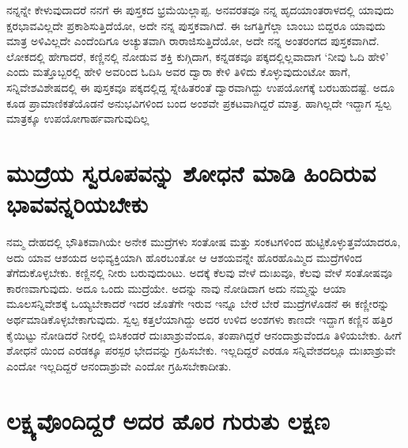 ನನ್ನನ್ನೇ ಕೇಳುವುದಾದರೆ ನನಗೆ ಈ ಪುಸ್ತಕದ ಭ್ರಮೆಯಿಲ್ಲಾಪ್ಪ. ಅನವರತವೂ ನನ್ನ ಹೃದಯಾಂತರಾಳದಲ್ಲಿ ಯಾವುದು ಕ್ಷರಭಾವವಿಲ್ಲದೇ ಪ್ರಕಾಶಿಸುತ್ತಿದೆಯೋ, ಅದೇ ನನ್ನ ಪುಸ್ತಕವಾಗಿದೆ. ಈ ಜಗತ್ತಿಗೆಲ್ಲಾ ಬಾಂಬು ಬಿದ್ದರೂ ಯಾವುದು ಮಾತ್ರ ಅಳಿವಿಲ್ಲದೇ ಎಂದೆಂದಿಗೂ ಅಚ್ಯುತವಾಗಿ ರಾರಾಜಿಸುತ್ತಿದೆಯೋ, ಅದೇ ನನ್ನ ಅಂತರಂಗದ ಪುಸ್ತಕವಾಗಿದೆ. ಲೋಕದಲ್ಲಿ ಹೇಗಾದರೆ, ಕಣ್ಣಿನಲ್ಲಿ ನೋಡುವ ಶಕ್ತಿ ಕುಗ್ಗಿದಾಗ, ಕನ್ನಡಕವೂ ಪಕ್ಕದಲ್ಲಿಲ್ಲವಾದಾಗ `ನೀವು ಓದಿ ಹೇಳಿ' ಎಂದು ಮತ್ತೊಬ್ಬರಲ್ಲಿ ಹೇಳಿ ಅವರಿಂದ ಓದಿಸಿ ಅವರ ದ್ವಾರಾ ಕೇಳಿ ತಿಳಿದು ಕೊಳ್ಳುವುದುಂಟೋ ಹಾಗೆ, ಸನ್ನಿವೇಶವಿಶೇಷದಲ್ಲಿ ಈ ಪುಸ್ತಕವೂ ಪಕ್ಕದಲ್ಲಿದ್ದ ಸ್ನೇಹಿತರಂತೆ ದ್ವಾರವಾಗಿದ್ದು ಉಪಯೋಗಕ್ಕೆ ಬರಬಹುದಷ್ಟೆ. ಅದೂ ಕೂಡ ಪ್ರಾಮಾಣಿಕತೆಯೊಡನೆ ಅನುಭವಿಗಳಿಂದ ಬಂದ ಅಂಶವೇ ಪ್ರಕಟವಾಗಿದ್ದರೆ ಮಾತ್ರ. ಹಾಗಿಲ್ಲದೇ ಇದ್ದಾಗ ಸ್ವಲ್ಪ ಮಾತ್ರಕ್ಕೂ ಉಪಯೋಗಾರ್ಹವಾಗುವುದಿಲ್ಲ

\section*{ಮುದ್ರೆಯ ಸ್ವರೂಪವನ್ನು ಶೋಧನೆ ಮಾಡಿ ಹಿಂದಿರುವ ಭಾವವನ್ನರಿಯಬೇಕು}

ನಮ್ಮ ದೇಹದಲ್ಲಿ ಭೌತಿಕವಾಗಿಯೇ ಅನೇಕ ಮುದ್ರೆಗಳು ಸಂತೋಷ ಮತ್ತು ಸಂಕಟಗಳಿಂದ ಹುಟ್ಟಿಕೊಳ್ಳುತ್ತವೆಯಾದರೂ, ಅದು ಯಾವ ಆಶಯದ ಅಭಿವ್ಯಕ್ತಿಯಾಗಿ ಹೊರಬಂತೋ ಆ ಆಶಯವನ್ನೇ ಹೊರಹೊಮ್ಮಿದ ಮುದ್ರೆಗಳಿಂದ ತೆಗೆದುಕೊಳ್ಳಬೇಕು. ಕಣ್ಣಿನಲ್ಲಿ ನೀರು ಬರುವುದುಂಟು. ಅದಕ್ಕೆ ಕೆಲವು ವೇಳೆ ದುಃಖವೂ, ಕೆಲವು ವೇಳೆ ಸಂತೋಷವೂ ಕಾರಣವಾಗುವುದು. ಅದೂ ಒಂದು ಮುದ್ರೆಯೇ. ಅದನ್ನು ನಾವು ನೋಡಿದಾಗ ಅದು ನಮ್ಮನ್ನು ಆಯಾ ಮೂಲಸನ್ನಿವೇಶಕ್ಕೆ ಒಯ್ಯಬೇಕಾದರೆ ಇದರ ಜೊತೆಗೇ ಇರುವ ಇನ್ನೂ ಬೇರೆ ಬೇರೆ ಮುದ್ರೆಗಳೊಡನೆ ಈ ಕಣ್ಣೀರನ್ನು  ಅರ್ಥಮಾಡಿಕೊಳ್ಳಬೇಕಾಗುವುದು. ಸ್ವಲ್ಪ ಕತ್ತಲೆಯಾಗಿದ್ದು ಅದರ ಉಳಿದ ಅಂಶಗಳು ಕಾಣದೇ ಇದ್ದಾಗ ಕಣ್ಣಿನ ಹತ್ತಿರ ಕೈಯಿಟ್ಟು ನೋಡಿದರೆ ನೀರಲ್ಲಿ ಬಿಸಿಕಂಡರೆ ದುಃಖಾಶ್ರುವೆಂದೂ, ತಂಪಾಗಿದ್ದರೆ ಆನಂದಾಶ್ರುವೆಂದೂ ತಿಳಿಯಬೇಕು. ಹೀಗೆ ಶೋಧನೆ ಯಿಂದ ಎರಡಕ್ಕೂ ಪರಸ್ಪರ ಭೇದವನ್ನು ಗ್ರಹಿಸಬೇಕು. ಇಲ್ಲದಿದ್ದರೆ ಎರಡೂ ಸನ್ನಿವೇಶದಲ್ಲೂ ದುಃಖಾಶ್ರುವೇ ಎಂದೋ ಇಲ್ಲದಿದ್ದರೆ ಆನಂದಾಶ್ರುವೇ ಎಂದೋ ಗ್ರಹಿಸಬೇಕಾದೀತು.

\section*{ಲಕ್ಷ್ಯವೊಂದಿದ್ದರೆ ಅದರ ಹೊರ ಗುರುತು ಲಕ್ಷಣ}

